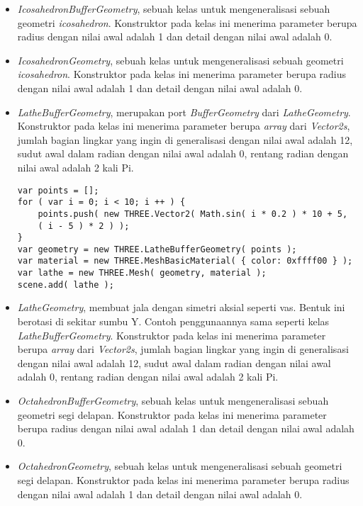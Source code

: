 \begin{itemize}
\begin{itemize}
	\item {\it IcosahedronBufferGeometry}, sebuah kelas untuk mengeneralisasi sebuah geometri {\it icosahedron}. Konstruktor pada kelas ini menerima parameter berupa radius dengan nilai awal adalah 1 dan detail dengan nilai awal adalah 0.

	\item {\it IcosahedronGeometry}, sebuah kelas untuk mengeneralisasi sebuah geometri {\it icosahedron}. Konstruktor pada kelas ini menerima parameter berupa radius dengan nilai awal adalah 1 dan detail dengan nilai awal adalah 0.

	\item {\it LatheBufferGeometry}, merupakan port {\it BufferGeometry} dari {\it LatheGeometry}. Konstruktor pada kelas ini menerima parameter berupa {\it array} dari {\it Vector2s}, jumlah bagian lingkar yang ingin di generalisasi dengan nilai awal adalah 12, sudut awal dalam radian dengan nilai awal adalah 0, rentang radian dengan nilai awal adalah 2 kali Pi.  
	
\begin{lstlisting}[caption={Contoh penggunaan kelas {\it LatheBufferGeometry}.},captionpos=b]
var points = [];
for ( var i = 0; i < 10; i ++ ) {
	points.push( new THREE.Vector2( Math.sin( i * 0.2 ) * 10 + 5,
	( i - 5 ) * 2 ) );
}
var geometry = new THREE.LatheBufferGeometry( points );
var material = new THREE.MeshBasicMaterial( { color: 0xffff00 } );
var lathe = new THREE.Mesh( geometry, material );
scene.add( lathe );
\end{lstlisting}

	\item {\it LatheGeometry}, membuat jala dengan simetri aksial seperti vas. Bentuk ini berotasi di sekitar sumbu Y. Contoh penggunaannya sama seperti kelas {\it LatheBufferGeometry}. Konstruktor pada kelas ini menerima parameter berupa {\it array} dari {\it Vector2s}, jumlah bagian lingkar yang ingin di generalisasi dengan nilai awal adalah 12, sudut awal dalam radian dengan nilai awal adalah 0, rentang radian dengan nilai awal adalah 2 kali Pi.  
	
	\item {\it OctahedronBufferGeometry}, sebuah kelas untuk mengeneralisasi sebuah geometri segi delapan. Konstruktor pada kelas ini menerima parameter berupa radius dengan nilai awal adalah 1 dan detail dengan nilai awal adalah 0.
	
	\item {\it OctahedronGeometry}, sebuah kelas untuk mengeneralisasi sebuah geometri segi delapan. Konstruktor pada kelas ini menerima parameter berupa radius dengan nilai awal adalah 1 dan detail dengan nilai awal adalah 0.
	

\end{itemize}
\end{itemize}
